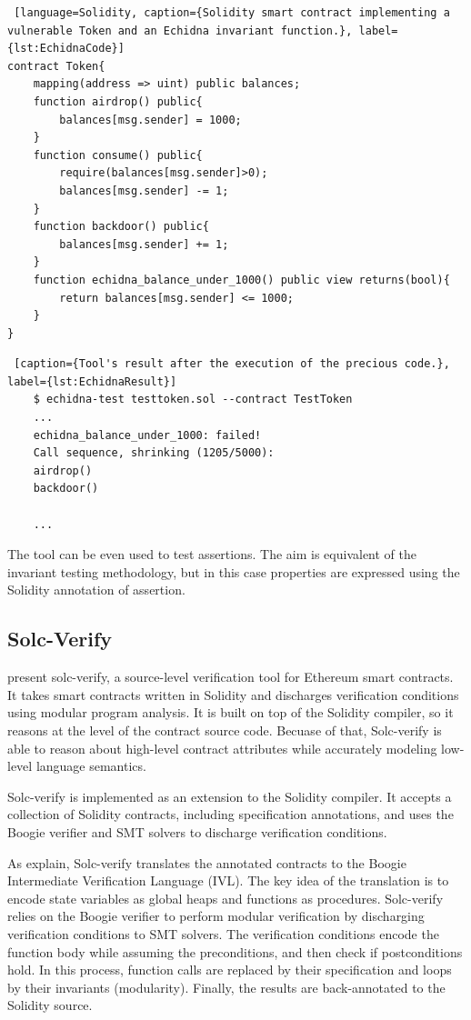 \begin{lstlisting} [language=Solidity, caption={Solidity smart contract implementing a vulnerable Token and an Echidna invariant function.}, label={lst:EchidnaCode}]
contract Token{
    mapping(address => uint) public balances;
    function airdrop() public{
        balances[msg.sender] = 1000;
    }
    function consume() public{
        require(balances[msg.sender]>0);
        balances[msg.sender] -= 1;
    }
    function backdoor() public{
        balances[msg.sender] += 1;
    }
    function echidna_balance_under_1000() public view returns(bool){
        return balances[msg.sender] <= 1000;
    }
}
\end{lstlisting}
\begin{lstlisting} [caption={Tool's result after the execution of the precious code.}, label={lst:EchidnaResult}]
    $ echidna-test testtoken.sol --contract TestToken
    ...
    echidna_balance_under_1000: failed!
    Call sequence, shrinking (1205/5000):
    airdrop()
    backdoor()

    ...
\end{lstlisting}

The tool can be even used to test assertions. 
The aim is equivalent of the invariant testing methodology, 
but in this case properties are expressed using the Solidity annotation of assertion.

\subsection{Solc-Verify}
\label{sec:Specification:Solc-Verify}

\citet{SolcVerify} present solc-verify, a source-level verification tool for
Ethereum smart contracts. It takes smart contracts written
in Solidity and discharges verification conditions using modular program
analysis. It is built on top of the Solidity compiler, so it reasons at the level of the contract source code. 
Becuase of that, Solc-verify is able to reason about high-level contract attributes 
while accurately modeling low-level language semantics.

Solc-verify is implemented as an extension to the Solidity compiler.
It accepts a collection of Solidity contracts, including specification annotations, and uses 
the Boogie verifier and SMT solvers to discharge verification conditions. 

As \citet{SolcVerify_2} explain, Solc-verify translates the annotated contracts to the Boogie Intermediate Verification
Language (IVL). The key idea of the translation is to encode state variables as global heaps
and functions as procedures. Solc-verify relies on the Boogie verifier to perform modular
verification by discharging verification conditions to SMT solvers. The verification conditions
encode the function body while assuming the preconditions, and then check if postconditions
hold. In this process, function calls are replaced by their specification and loops by their
invariants (modularity). Finally, the results are back-annotated to the Solidity source.

